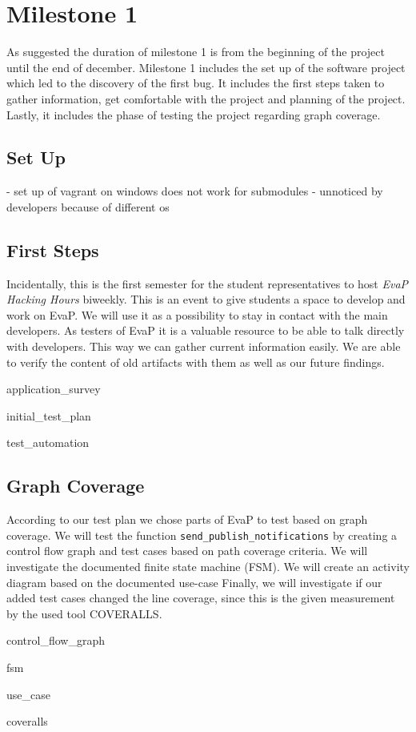 \section{Milestone 1}
As suggested the duration of milestone 1 is from the beginning of the project until the end of december.
Milestone 1 includes the set up of the software project which led to the discovery of the first bug.
It includes the first steps taken to gather information, get comfortable with the project and planning of the project.
Lastly, it includes the phase of testing the project regarding graph coverage.

\subsection{Set Up}
- set up of vagrant on windows does not work for submodules
- unnoticed by developers because of different os


\subsection{First Steps}
Incidentally, this is the first semester for the student representatives to host \emph{EvaP Hacking Hours} biweekly.
This is an event to give students a space to develop and work on EvaP.
We will use it as a possibility to stay in contact with the main developers.
As testers of EvaP it is a valuable resource to be able to talk directly with developers.
This way we can gather current information easily.
We are able to verify the content of old artifacts with them as well as our future findings.

{application_survey}

{initial_test_plan}

{test_automation}

\subsection{Graph Coverage}
According to our test plan we chose parts of EvaP to test based on graph coverage. 
We will test the function \texttt{send\_publish\_notifications} by creating a control flow graph and test cases based on path coverage criteria. 
We will investigate the documented finite state machine (FSM). 
We will create an activity diagram based on the documented use-case %
Finally, we will investigate if our added test cases changed the line coverage, since this is the given measurement by the used tool COVERALLS.

{control_flow_graph}

{fsm}

{use_case}

{coveralls}
